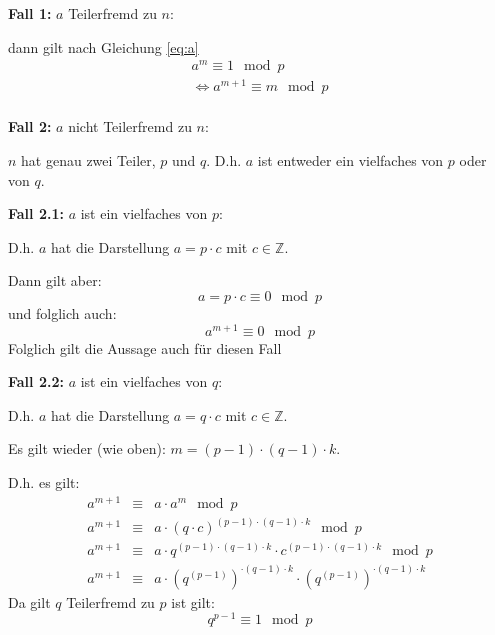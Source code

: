 \documentclass[DIN, pagenumber=false, fontsize=11pt, parskip=half]{scrartcl}
\begin{document}
\begin{enumerate}[label=(\roman*)]
            \textbf{Fall 1:} $a$ Teilerfremd zu $n$:
            
            dann gilt nach Gleichung \ref{eq:a}
            \begin{eqnarray}
                a^m \equiv 1 \mod p \\
                \Leftrightarrow a^{m+1} \equiv m \mod p \\
            \end{eqnarray}

            \textbf{Fall 2:} $a$ nicht Teilerfremd zu $n$:
            
            $n$ hat genau zwei Teiler, $p$ und $q$. D.h. $a$ ist entweder ein
            vielfaches von $p$ oder von $q$.

            \textbf{Fall 2.1:} $a$ ist ein vielfaches von $p$:

            D.h. $a$ hat die Darstellung $a=p \cdot c$ mit $c \in \mathbb{Z}$.

            Dann gilt aber:
            \begin{equation}
                a = p \cdot c \equiv 0 \mod p
            \end{equation}
            und folglich auch:
            \begin{equation}
                a^{m+1} \equiv 0 \mod p
            \end{equation}
            Folglich gilt die Aussage auch für diesen Fall

            \textbf{Fall 2.2:} $a$ ist ein vielfaches von $q$:
    
            D.h. $a$ hat die Darstellung $a=q \cdot c$ mit $c \in \mathbb{Z}$.

            Es gilt wieder (wie oben): $m = (p-1) \cdot (q-1) \cdot k$.

            D.h. es gilt:
            \begin{eqnarray}
                a^{m+1} &\equiv& a \cdot a^m \mod p \\
                a^{m+1} &\equiv& a \cdot {\left(q \cdot c\right)}^{(p-1)\cdot(q-1)\cdot k} \mod p \\
                a^{m+1} &\equiv& a \cdot q^{(p-1)\cdot(q-1)\cdot k} \cdot c^{(p-1)\cdot(q-1)\cdot k} \mod p \\
                a^{m+1} &\equiv& a \cdot {\left(q^{(p-1)}\right)}^{\cdot(q-1)\cdot k} \cdot {\left(q^{(p-1)}\right)}^{\cdot(q-1)\cdot k}
            \end{eqnarray}
            Da gilt $q$ Teilerfremd zu $p$ ist gilt:
            \begin{equation}
                 q^{p-1} \equiv 1 \mod p
            \end{equation}


\end{enumerate}
\end{document}
